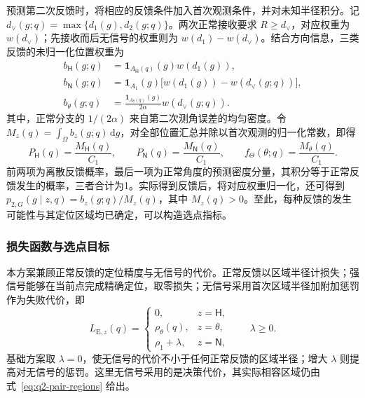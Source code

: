 \documentclass[UTF8,a4paper,zihao=-4,fontset=none]{ctexart}
\begin{document}
预测第二次反馈时，将相应的反馈条件加入首次观测条件，并对未知半径积分。记 \(d_\vee(g;q)=\max\{d_1(g),d_2(g;q)\}\)。两次正常接收要求 \(R\ge d_\vee\)，对应权重为 \(w(d_\vee)\)；先接收而后无信号的权重则为 \(w(d_1)-w(d_\vee)\)。结合方向信息，三类反馈的未归一化位置权重为
\begin{equation}
\begin{aligned}
 b_{\mathsf H}(g;q)&=\mathbf1_{A_{\mathsf H}(q)}(g)w(d_1(g)),\\
 b_{\mathsf N}(g;q)&=\mathbf1_{A_1}(g)\bigl[w(d_1(g))-w(d_\vee(g;q))\bigr],\\
 b_\theta(g;q)&=\frac{\mathbf1_{A_\theta(q)}(g)}{2\alpha}w(d_\vee(g;q)).
\end{aligned}
\label{eq:q2-pair-feedback-weights}
\end{equation}
其中，正常分支的 \(1/(2\alpha)\) 来自第二次测角误差的均匀密度。令 \(M_z(q)=\int_\Omega b_z(g;q)\,\mathrm dg\)，对全部位置汇总并除以首次观测的归一化常数，即得
\begin{equation}
 P_{\mathsf H}(q)=\frac{M_{\mathsf H}(q)}{C_1},\qquad
 P_{\mathsf N}(q)=\frac{M_{\mathsf N}(q)}{C_1},\qquad
 f_\Theta(\theta;q)=\frac{M_\theta(q)}{C_1}.
\label{eq:q2-pair-prediction}
\end{equation}
前两项为离散反馈概率，最后一项为正常角度的预测密度分量，其积分等于正常反馈发生的概率，三者合计为1。实际得到反馈后，将对应权重归一化，还可得到 \(p_{2,G}(g\mid z,q)=b_z(g;q)/M_z(q)\)，其中 \(M_z(q)>0\)。至此，每种反馈的发生可能性与其定位区域均已确定，可以构造选点指标。

\subsubsection{损失函数与选点目标}

本方案兼顾正常反馈的定位精度与无信号的代价。正常反馈以区域半径计损失；强信号能够在当前点完成精确定位，取零损失；无信号采用首次区域半径加附加惩罚作为失败代价，即
\begin{equation}
 L_{\mathrm E,z}(q)=
 \begin{cases}
 0,&z=\mathsf H,\\
 \rho_\theta(q),&z=\theta,\\
 \rho_1+\lambda,&z=\mathsf N,
 \end{cases}
 \qquad \lambda\ge0.
\label{eq:q2-pair-expected-loss}
\end{equation}
基础方案取 \(\lambda=0\)，使无信号的代价不小于任何正常反馈的区域半径；增大 \(\lambda\) 则提高对无信号的惩罚。这里无信号采用的是决策代价，其实际相容区域仍由式~\eqref{eq:q2-pair-regions} 给出。
\end{document}
